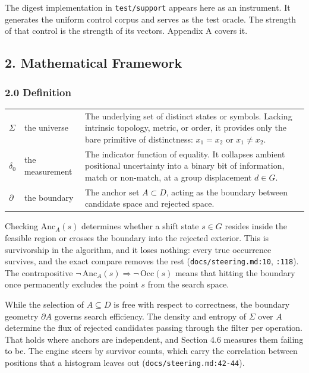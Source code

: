 The digest implementation in \texttt{test/\allowbreak{}support} appears here as an instrument. It generates the uniform control corpus and serves as the test oracle. The strength of that control is the strength of its vectors. Appendix A covers it.

\subsection{2. Mathematical Framework}

\subsubsection{2.0 Definition}

\begin{center}
  \begin{tabular}{@{}p{2.2em}p{7.5em}p{}@{}}
    \toprule
    $\Sigma$   & the universe    &
      The underlying set of distinct states or symbols. Lacking intrinsic topology, metric, or
      order, it provides only the bare primitive of distinctness: $x_1 = x_2$ or $x_1 \neq x_2$. \\
    \addlinespace[0.7em]
    $\delta_0$ & the measurement &
      The indicator function of equality. It collapses ambient positional uncertainty into a
      binary bit of information, match or non-match, at a group displacement $d \in G$. \\
    \addlinespace[0.7em]
    $\partial$ & the boundary    &
      The anchor set $A \subset D$, acting as the boundary between candidate space and rejected
      space. \\
    \bottomrule
  \end{tabular}
\end{center}

Checking $\mathrm{Anc}_A(s)$ determines whether a shift state $s \in G$ resides inside the feasible
region or crosses the boundary into the rejected exterior. This is survivorship in the algorithm,
and it loses nothing: every true occurrence survives, and the exact compare removes the rest
(\texttt{docs/\allowbreak{}steering.md:10}, \texttt{:118}). The contrapositive $\neg\,\mathrm{Anc}_A(s) \Longrightarrow \neg\,\mathrm{Occ}(s)$ means
that hitting the boundary once permanently excludes the point $s$ from the search space.

While the selection of $A \subseteq D$ is free with respect to correctness, the boundary geometry
$\partial A$ governs search efficiency. The density and entropy of $\Sigma$ over $A$ determine the
flux of rejected candidates passing through the filter per operation. That holds where anchors are
independent, and Section 4.6 measures them failing to be. The engine steers by survivor counts,
which carry the correlation between positions that a histogram leaves out
(\texttt{docs/\allowbreak{}steering.md:42-\allowbreak{}44}).

